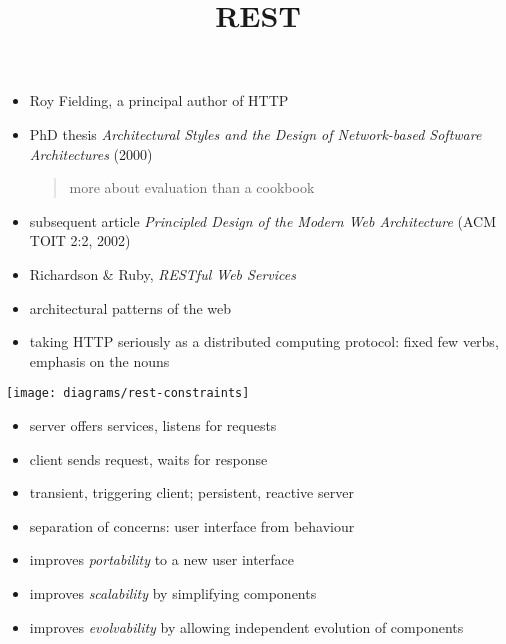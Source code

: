 \documentclass{sepslide-soa-faked} %
\title{REST}
\begin{document}
\begin{slide}
  \Title
\end{slide}

\begin{slide}
  \Contents
\end{slide}

\begin{slide}
\begin{itemize}
\item Roy Fielding, a principal author of HTTP
\item PhD thesis \textit{Architectural Styles and the Design of Network-based Software Architectures} (2000)
\begin{quote}
more about evaluation than a cookbook
\end{quote}
\item subsequent article \textit{Principled Design of the Modern Web Architecture} (ACM TOIT 2:2, 2002)
\item Richardson \& Ruby, \textit{RESTful Web Services}
\item architectural patterns of the web
\item taking HTTP seriously as a distributed computing protocol:
fixed few verbs, emphasis on the nouns
\end{itemize}
\end{slide}

\begin{slide}
\texttt{[image: diagrams/rest-constraints]}
\end{slide}

\begin{slide}
\begin{itemize}
\item server offers services, listens for requests
\item client sends request, waits for response
\item transient, triggering client; persistent, reactive server
\item separation of concerns: user interface from behaviour
\item improves \emph{portability} to a new user interface
\item improves \emph{scalability} by simplifying components
\item improves \emph{evolvability} by allowing independent evolution of components
\end{itemize}
\end{slide}
\end{document}
